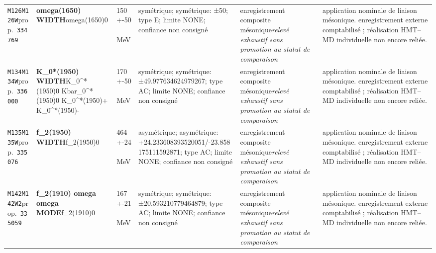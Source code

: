 \begin{landscape}
\begin{longtable}{L{1.85cm}L{4.45cm}L{2.35cm}L{4.05cm}L{3.35cm}L{7.15cm}}
\texttt{M126}\newline \texttt{M126W}\newline prop.\ \texttt{334769} & \textbf{omega(1650) WIDTH}\newline omega(1650)0 & 150+-50\,MeV & symétrique; symétrique: ±50; type E; limite NONE; confiance non consigné & enregistrement composite mésonique\newline \emph{relevé exhaustif sans promotion au statut de comparaison} & application nominale de liaison mésonique. enregistrement externe comptabilisé ; réalisation HMT--MD individuelle non encore reliée. \\
\texttt{M134}\newline \texttt{M134W}\newline prop.\ \texttt{336000} & \textbf{K\_\allowbreak{}0*(1950) WIDTH}\newline K\_\allowbreak{}0\textasciicircum{}*(1950)0 \textbar{}\allowbreak{} Kbar\_\allowbreak{}0\textasciicircum{}*(1950)0 \textbar{}\allowbreak{} K\_\allowbreak{}0\textasciicircum{}*(1950)+ \textbar{}\allowbreak{} K\_\allowbreak{}0\textasciicircum{}*(1950)- & 170+-50\,MeV & symétrique; symétrique: ±49.977634624979267; type AC; limite NONE; confiance non consigné & enregistrement composite mésonique\newline \emph{relevé exhaustif sans promotion au statut de comparaison} & application nominale de liaison mésonique. enregistrement externe comptabilisé ; réalisation HMT--MD individuelle non encore reliée. \\
\texttt{M135}\newline \texttt{M135W}\newline prop.\ \texttt{335076} & \textbf{f\_\allowbreak{}2(1950) WIDTH}\newline f\_\allowbreak{}2(1950)0 & 464+-24\,MeV & asymétrique; asymétrique: +24.233608393520051/-23.858175111592871; type AC; limite NONE; confiance non consigné & enregistrement composite mésonique\newline \emph{relevé exhaustif sans promotion au statut de comparaison} & application nominale de liaison mésonique. enregistrement externe comptabilisé ; réalisation HMT--MD individuelle non encore reliée. \\
\texttt{M142}\newline \texttt{M142W2}\newline prop.\ \texttt{335059} & \textbf{f\_\allowbreak{}2(1910) omega omega MODE}\newline f\_\allowbreak{}2(1910)0 & 167+-21\,MeV & symétrique; symétrique: ±20.593210779464879; type AC; limite NONE; confiance non consigné & enregistrement composite mésonique\newline \emph{relevé exhaustif sans promotion au statut de comparaison} & application nominale de liaison mésonique. enregistrement externe comptabilisé ; réalisation HMT--MD individuelle non encore reliée. \\

\end{longtable}
\end{landscape}
